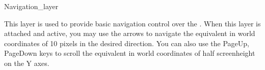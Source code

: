 
\begin{ccRefClass}{Navigation_layer}


\ccInheritsFrom
{}

\ccGlue

\ccCreation
{}


This layer is used to provide basic navigation control over the 
. When this layer is attached and active, you may use 
the arrows to navigate the equivalent in world coordinates of 10 pixels 
in the desired direction. You can also use the PageUp, PageDown keys to 
scroll the equivalent in world coordinates of half screenheight on the Y axes.


\end{ccRefClass}









